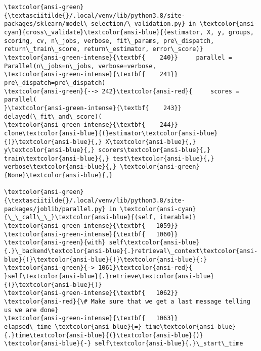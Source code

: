 \documentclass[11pt]{article}
\begin{document}
\begin{Verbatim}[commandchars=\\\{\}, frame=single, framerule=2mm, rulecolor=\color{outerrorbackground}]
\textcolor{ansi-green}{\textasciitilde{}/.local/venv/lib/python3.8/site-packages/sklearn/model\_selection/\_validation.py} in \textcolor{ansi-cyan}{cross\_validate}\textcolor{ansi-blue}{(estimator, X, y, groups, scoring, cv, n\_jobs, verbose, fit\_params, pre\_dispatch, return\_train\_score, return\_estimator, error\_score)}
\textcolor{ansi-green-intense}{\textbf{    240}}     parallel = Parallel(n\_jobs=n\_jobs, verbose=verbose,
\textcolor{ansi-green-intense}{\textbf{    241}}                         pre\_dispatch=pre\_dispatch)
\textcolor{ansi-green}{--> 242}\textcolor{ansi-red}{     scores = parallel(
}\textcolor{ansi-green-intense}{\textbf{    243}}         delayed(\_fit\_and\_score)(
\textcolor{ansi-green-intense}{\textbf{    244}}             clone\textcolor{ansi-blue}{(}estimator\textcolor{ansi-blue}{)}\textcolor{ansi-blue}{,} X\textcolor{ansi-blue}{,} y\textcolor{ansi-blue}{,} scorers\textcolor{ansi-blue}{,} train\textcolor{ansi-blue}{,} test\textcolor{ansi-blue}{,} verbose\textcolor{ansi-blue}{,} \textcolor{ansi-green}{None}\textcolor{ansi-blue}{,}

\textcolor{ansi-green}{\textasciitilde{}/.local/venv/lib/python3.8/site-packages/joblib/parallel.py} in \textcolor{ansi-cyan}{\_\_call\_\_}\textcolor{ansi-blue}{(self, iterable)}
\textcolor{ansi-green-intense}{\textbf{   1059}} 
\textcolor{ansi-green-intense}{\textbf{   1060}}             \textcolor{ansi-green}{with} self\textcolor{ansi-blue}{.}\_backend\textcolor{ansi-blue}{.}retrieval\_context\textcolor{ansi-blue}{(}\textcolor{ansi-blue}{)}\textcolor{ansi-blue}{:}
\textcolor{ansi-green}{-> 1061}\textcolor{ansi-red}{                 }self\textcolor{ansi-blue}{.}retrieve\textcolor{ansi-blue}{(}\textcolor{ansi-blue}{)}
\textcolor{ansi-green-intense}{\textbf{   1062}}             \textcolor{ansi-red}{\# Make sure that we get a last message telling us we are done}
\textcolor{ansi-green-intense}{\textbf{   1063}}             elapsed\_time \textcolor{ansi-blue}{=} time\textcolor{ansi-blue}{.}time\textcolor{ansi-blue}{(}\textcolor{ansi-blue}{)} \textcolor{ansi-blue}{-} self\textcolor{ansi-blue}{.}\_start\_time


\end{Verbatim}
\end{document}
